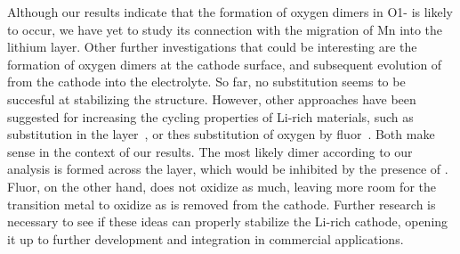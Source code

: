 \begin{refsection}
Although our results indicate that the formation of oxygen dimers in 
O1- is likely to occur, we have yet to study its connection 
with the migration of Mn into the lithium layer. Other further investigations 
that could be interesting are the formation of oxygen dimers at the cathode 
surface, and subsequent evolution of  from the cathode into the 
electrolyte. So far, no substitution seems to be succesful at stabilizing 
the structure. However, other approaches have been suggested for 
increasing the cycling properties of Li-rich materials, such as  
substitution in the  layer~\cite{Yang2017}, or thes substitution of 
oxygen by fluor~\cite{Kapylou2017}. Both make sense in the context of 
our results. The most likely dimer according to our analysis is formed 
across the  layer, which would be inhibited by the presence of . 
Fluor, on the other hand, does not oxidize  as much, leaving more 
room for the transition metal to oxidize as  is removed from the 
cathode. Further research is necessary to see if these ideas can properly 
stabilize the Li-rich cathode, opening it up to further development and 
integration in commercial applications.
 
\printbibliography 
\end{refsection} 